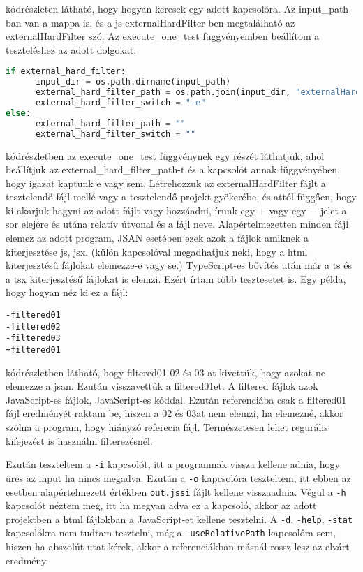  kódrészleten látható, hogy hogyan keresek egy adott kapcsolóra. Az input\_path-ban van a mappa is, és a js-externalHardFilter-ben megtalálható az externalHardFilter szó.
Az execute\_one\_test függvényemben beállítom a teszteléshez az adott dolgokat.

\begin{lstlisting}[caption={JSAN kapcsoló beállítása pythonban}, label={lst:python_kapcsolo_beallitasa}, language={Python}]
if external_hard_filter:
      input_dir = os.path.dirname(input_path)
      external_hard_filter_path = os.path.join(input_dir, "externalHardFilter.txt")
      external_hard_filter_switch = "-e"
else:
      external_hard_filter_path = ""
      external_hard_filter_switch = ""
\end{lstlisting}

 kódrészletben az execute\_one\_test függvénynek egy részét láthatjuk, ahol beállítjuk az external\_hard\_filter\_path-t és a kapcsolót annak függvényében, hogy igazat kaptunk e vagy sem.
Létrehozzuk az externalHardFilter fájlt a tesztelendő fájl mellé vagy a tesztelendő projekt gyökerébe,
és attól függően, hogy ki akarjuk hagyni az adott fájlt vagy hozzáadni, írunk egy $+$ vagy egy $-$ jelet a sor elejére és utána relatív útvonal és a fájl neve.
Alapértelmezetten minden fájl elemez az adott program, JSAN esetében ezek azok a fájlok amiknek a kiterjesztése js, jsx. (külön kapcsolóval megadhatjuk neki, hogy a html kiterjesztésű fájlokat elemezze-e vagy se.)
TypeScript-es bővítés után már a ts és a tsx kiterjesztésű fájlokat is elemzi. Ezért írtam több tesztesetet is. Egy példa, hogy hogyan néz ki ez a fájl:

\begin{lstlisting}[caption={ExternalHardFilter fájl}, label={lst:external_hard_filter}]
-filtered01
-filtered02
-filtered03
+filtered01
\end{lstlisting}

 kódrészletben látható, hogy filtered01 02 és 03 at kivettük, hogy azokat ne elemezze a jsan.
Ezután visszavettük a filtered01et. A filtered fájlok azok JavaScript-es fájlok, JavaScript-es kóddal.
Ezután referenciába csak a filtered01 fájl eredményét raktam be, hiszen a 02 és 03at nem elemzi, ha elemezné, akkor szólna a program, hogy hiányzó referecia fájl.
Természetesen lehet regurális kifejezést is használni filterezésnél.

\noindent

Ezután teszteltem a \texttt{-i} kapcsolót, itt a programnak vissza kellene adnia, hogy üres az input ha nincs megadva.
Ezután a \texttt{-o} kapcsolóra teszteltem, itt ebben az esetben alapértelmezett értékben \texttt{out.jssi} fájlt kellene visszaadnia.
Végül a \texttt{-h} kapcsolót néztem meg, itt ha megvan adva ez a kapcsoló, akkor az adott projektben a html fájlokban a JavaScript-et kellene tesztelni.
A \texttt{-d}, \texttt{-help}, \texttt{-stat} kapcsolókra nem tudtam tesztelni, még a \texttt{-useRelativePath} kapcsolóra sem, hiszen ha abszolút utat kérek, akkor a referenciákban másnál rossz lesz az elvárt eredmény.

